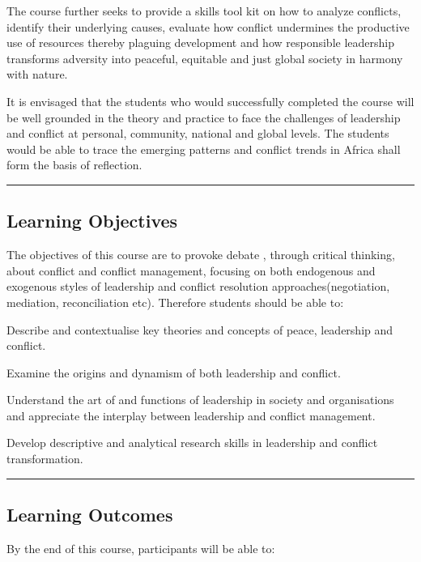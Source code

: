 The course further seeks to provide a skills tool kit on how to analyze conflicts, identify their
underlying causes, evaluate how conflict undermines the productive use of resources thereby
plaguing development and how responsible leadership transforms adversity into peaceful,
equitable and just global society in harmony with nature.

It is envisaged that the students who would successfully completed the course will be well
grounded in the theory and practice to face the challenges of leadership and conflict at personal,
community, national and global levels. The students would be able to trace the emerging patterns
and conflict trends in Africa shall form the basis of reflection.
\vspace{2ex} \hrule\vspace{2ex}

\subsection*{Learning Objectives}
The objectives of this course are to provoke debate , through critical thinking, about conflict and
conflict management, focusing on both endogenous and exogenous styles of leadership and
conflict resolution approaches(negotiation, mediation, reconciliation etc). Therefore students
should be able to:
\begin{outline}
    \1      Describe and contextualise key theories and concepts of peace, leadership and conflict.

    \1  	Examine the origins and dynamism of both leadership and conflict.

    \1  	Understand the art of and functions of leadership in society and organisations and appreciate the interplay between leadership and conflict management.

    \1  	Develop descriptive and analytical research skills in leadership and conflict transformation.

\end{outline}
\vspace{2ex}\hrule\vspace{2ex}



\subsection*{Learning Outcomes}
By the end of this course, participants will be able to:

